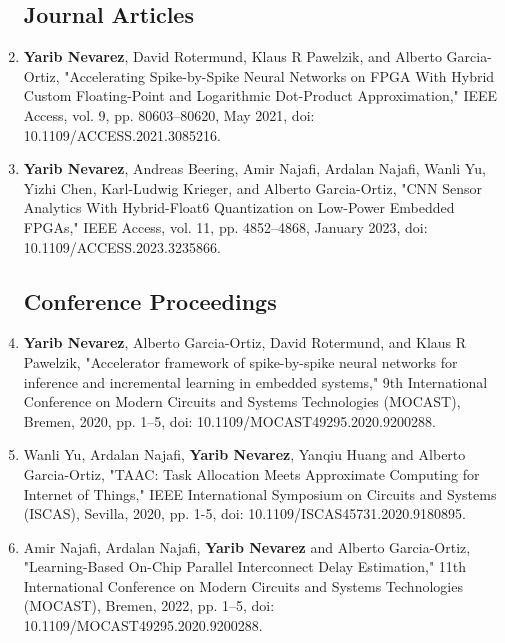 \begin{enumerate}
	
	\subsection*{Journal Articles}
	
	\item \textbf{Yarib Nevarez}, David Rotermund, Klaus R Pawelzik, and Alberto Garcia-Ortiz, "Accelerating Spike-by-Spike Neural Networks on FPGA With Hybrid Custom Floating-Point and Logarithmic Dot-Product Approximation," 
	\newblock IEEE Access, vol. 9, pp. 80603--80620, May 2021, doi: 10.1109/ACCESS.2021.3085216.  
	
	\item \textbf{Yarib Nevarez}, Andreas Beering, Amir Najafi, Ardalan Najafi, Wanli Yu, Yizhi Chen, Karl-Ludwig Krieger, and Alberto Garcia-Ortiz, "CNN Sensor Analytics With Hybrid-Float6 Quantization on Low-Power Embedded FPGAs," 
	\newblock IEEE Access, vol. 11, pp. 4852--4868, January 2023, doi: 10.1109/ACCESS.2023.3235866.

	
	\subsection*{Conference Proceedings}
	
	\item \textbf{Yarib Nevarez}, Alberto Garcia-Ortiz, David Rotermund, and Klaus R Pawelzik, "Accelerator framework of spike-by-spike neural networks for inference and incremental learning in embedded systems,"
	 9th International Conference on Modern Circuits and Systems Technologies (MOCAST), Bremen, 2020, pp. 1--5, doi: 10.1109/MOCAST49295.2020.9200288.
	
	\item Wanli Yu, Ardalan Najafi, \textbf{Yarib Nevarez}, Yanqiu Huang and Alberto Garcia-Ortiz, "TAAC: Task Allocation Meets Approximate Computing for Internet of Things," 
	 IEEE International Symposium on Circuits and Systems (ISCAS), Sevilla, 2020, pp. 1-5, doi: 10.1109/ISCAS45731.2020.9180895.
	
	\item Amir Najafi, Ardalan Najafi, \textbf{Yarib Nevarez} and Alberto Garcia-Ortiz, "Learning-Based On-Chip Parallel Interconnect Delay Estimation," 
	 11th International Conference on Modern Circuits and Systems Technologies (MOCAST), Bremen, 2022, pp. 1--5, doi: 10.1109/MOCAST49295.2020.9200288.
	

\end{enumerate}
